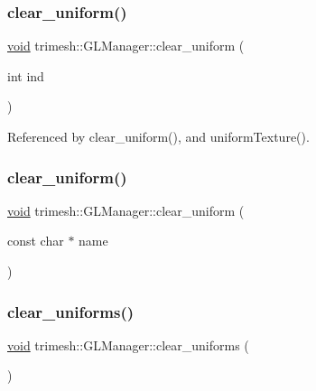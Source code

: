 \subsubsection{\texorpdfstring{clear\+\_\+uniform()}{clear\_uniform()}\hspace{0.1cm}{\footnotesize\ttfamily [1/2]}}
{\footnotesize\ttfamily \hyperlink{namespacetrimesh_a784ddfd979e1c579bda795a8edfc3f43}{void} trimesh\+::\+G\+L\+Manager\+::clear\+\_\+uniform (\begin{DoxyParamCaption}\item[{int}]{ind }\end{DoxyParamCaption})}



Referenced by clear\+\_\+uniform(), and uniform\+Texture().

\mbox{\label{classtrimesh_1_1GLManager_a080cfb98fd371dcc43d8ae7a4eed5b33}} 
\subsubsection{\texorpdfstring{clear\+\_\+uniform()}{clear\_uniform()}\hspace{0.1cm}{\footnotesize\ttfamily [2/2]}}
{\footnotesize\ttfamily \hyperlink{namespacetrimesh_a784ddfd979e1c579bda795a8edfc3f43}{void} trimesh\+::\+G\+L\+Manager\+::clear\+\_\+uniform (\begin{DoxyParamCaption}\item[{const char $\ast$}]{name }\end{DoxyParamCaption})\hspace{0.3cm}{\ttfamily [inline]}}

\mbox{\label{classtrimesh_1_1GLManager_a06242b954d4426b0c9cbc3eefbfcfe0b}} 
\subsubsection{\texorpdfstring{clear\+\_\+uniforms()}{clear\_uniforms()}}
{\footnotesize\ttfamily \hyperlink{namespacetrimesh_a784ddfd979e1c579bda795a8edfc3f43}{void} trimesh\+::\+G\+L\+Manager\+::clear\+\_\+uniforms (\begin{DoxyParamCaption}{ }\end{DoxyParamCaption})}



